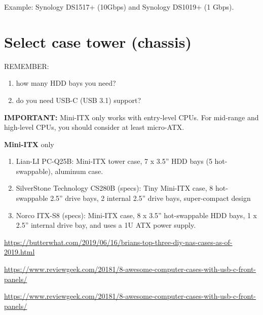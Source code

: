 Example: Synology DS1517+ (10Gbps) and Synology DS1019+ (1 Gbps). 



\section{Select case tower (chassis)}
\label{sec:chassis}

REMEMBER:
\begin{enumerate}
  \item  how many HDD bays you need?
  
  \item do you need USB-C (USB 3.1) support?
  
  
\end{enumerate}

{\bf IMPORTANT:} Mini-ITX only works with entry-level CPUs. For mid-range and
high-level CPUs, you should consider at least micro-ATX.
 
{\bf Mini-ITX} only
\begin{enumerate}
  \item  Lian-LI PC-Q25B: Mini-ITX tower case, 7 x 3.5” HDD bays (5 hot-swappable), aluminum case.
  
  \item SilverStone Technology CS280B (specs): Tiny Mini-ITX case, 8 hot-swappable 2.5” drive bays, 2 internal 2.5” drive bays, super-compact design
  
  \item Norco ITX-S8 (specs): Mini-ITX case, 8 x 3.5” hot-swappable HDD bays, 1 x 2.5” internal drive bay, and uses a 1U ATX power supply.
    
\end{enumerate}
\url{https://butterwhat.com/2019/06/16/brians-top-three-diy-nas-cases-as-of-2019.html}

\url{https://www.reviewgeek.com/20181/8-awesome-computer-cases-with-usb-c-front-panels/}

\url{https://www.reviewgeek.com/20181/8-awesome-computer-cases-with-usb-c-front-panels/}

